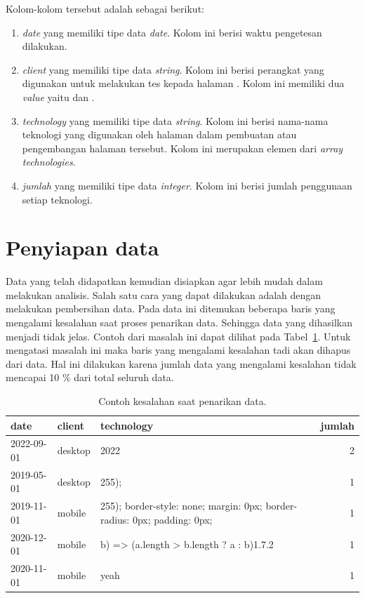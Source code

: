 Kolom-kolom tersebut adalah sebagai berikut:
\begin{enumerate}
    \item \textit{date} yang memiliki tipe data \textit{date}. Kolom ini berisi waktu pengetesan dilakukan.

    \item \textit{client} yang memiliki tipe data \textit{string}. Kolom ini berisi perangkat yang digunakan untuk melakukan tes kepada halaman \web. Kolom ini memiliki dua \textit{value} yaitu \desktop dan \mobile.

    \item \textit{technology} yang memiliki tipe data \textit{string}. Kolom ini berisi nama-nama teknologi yang digunakan oleh halaman \web dalam pembuatan atau pengembangan halaman \web tersebut. Kolom ini merupakan elemen dari \textit{array technologies}.

    \item \textit{jumlah} yang memiliki tipe data \textit{integer}. Kolom ini berisi jumlah penggunaan setiap teknologi.
\end{enumerate}

\section{Penyiapan data}
\label{sec:penyiapan}

Data yang telah didapatkan kemudian disiapkan agar lebih mudah dalam melakukan analisis. Salah satu cara yang dapat dilakukan adalah dengan melakukan pembersihan data. Pada data ini ditemukan beberapa baris yang mengalami kesalahan saat proses penarikan data. Sehingga data yang dihasilkan menjadi tidak jelas. Contoh dari masalah ini dapat dilihat pada Tabel~\ref{tab:kesalahan}. Untuk mengatasi masalah ini maka baris yang mengalami kesalahan tadi akan dihapus dari data. Hal ini dilakukan karena jumlah data yang mengalami kesalahan tidak mencapai 10 \% dari total seluruh data. 

\begin{table}[H]
\centering
\caption{Contoh kesalahan saat penarikan data.}
\label{tab:kesalahan}
\begin{tabular}{|l|l|l|r|}
\hline
date & client & technology & jumlah \\ \hline
2022-09-01 & desktop & 2022 & 2 \\ \hline
2019-05-01 & desktop & 255); & 1 \\ \hline
2019-11-01 & mobile & 255); border-style: none; margin: 0px; border-radius: 0px; padding: 0px; & 1 \\ \hline
2020-12-01 & mobile & b) => (a.length > b.length ? a : b)1.7.2 & 1 \\ \hline
2020-11-01 & mobile & yeah & 1 \\ \hline
\end{tabular}
\end{table}


